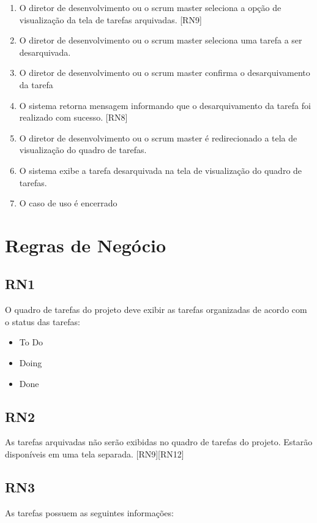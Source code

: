 \begin{enumerate}
  \item O diretor de desenvolvimento ou o scrum master seleciona a opção de visualização da tela de tarefas arquivadas. [RN9]
  \item O diretor de desenvolvimento ou o scrum master seleciona uma tarefa a ser desarquivada.
  \item O diretor de desenvolvimento ou o scrum master confirma o desarquivamento da tarefa
  \item O sistema retorna mensagem informando que o desarquivamento da tarefa foi realizado com sucesso. [RN8]
  \item O diretor de desenvolvimento ou o scrum master é redirecionado a tela de visualização do quadro de tarefas.
  \item O sistema exibe a tarefa desarquivada na tela de visualização do quadro de tarefas.
  \item O caso de uso é encerrado
\end{enumerate}


\section{Regras de Negócio}

\subsection{RN1}

O quadro de tarefas do projeto deve exibir as tarefas organizadas de acordo com o status das tarefas:
\begin{itemize}
  \item To Do
  \item Doing
  \item Done
\end{itemize}

\subsection{RN2}

As tarefas arquivadas não serão exibidas no quadro de tarefas do projeto. Estarão disponíveis em uma tela separada. [RN9][RN12]

\subsection{RN3}

As tarefas possuem as seguintes informações:

